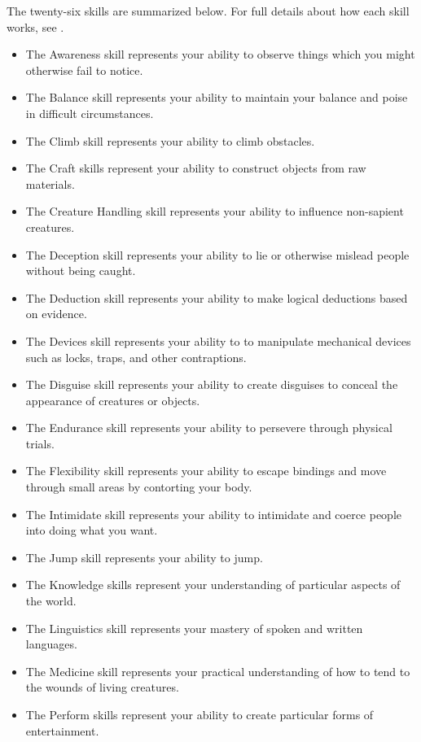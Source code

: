     The twenty-six skills are summarized below.
    For full details about how each skill works, see .

    \begin{itemize}
        \item The Awareness skill represents your ability to observe things which you might otherwise fail to notice.
        \item The Balance skill represents your ability to maintain your balance and poise in difficult circumstances.
        \item The Climb skill represents your ability to climb obstacles.
        \item The Craft skills represent your ability to construct objects from raw materials.
        \item The Creature Handling skill represents your ability to influence non-sapient creatures.
        \item The Deception skill represents your ability to lie or otherwise mislead people without being caught.
        \item The Deduction skill represents your ability to make logical deductions based on evidence.
        \item The Devices skill represents your ability to to manipulate mechanical devices such as locks, traps, and other contraptions.
        \item The Disguise skill represents your ability to create disguises to conceal the appearance of creatures or objects.
        \item The Endurance skill represents your ability to persevere through physical trials.
        \item The Flexibility skill represents your ability to escape bindings and move through small areas by contorting your body.
        \item The Intimidate skill represents your ability to intimidate and coerce people into doing what you want.
        \item The Jump skill represents your ability to jump.
        \item The Knowledge skills represent your understanding of particular aspects of the world.
        \item The Linguistics skill represents your mastery of spoken and written languages.
        \item The Medicine skill represents your practical understanding of how to tend to the wounds of living creatures.
        \item The Perform skills represent your ability to create particular forms of entertainment.

\end{itemize}
